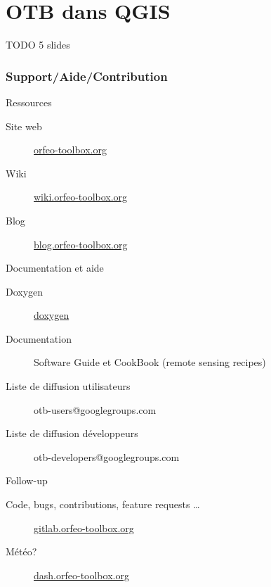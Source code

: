 \documentclass[8pt]{beamer}
\begin{document}
\section{OTB dans QGIS}

\begin{frame}
TODO 5 slides
\end{frame}

\begin{frame}
\frametitle{Support/Aide/Contribution}
\vspace{-0.2cm}
\begin{block}{Ressources}
\vspace{-0.2cm}
\begin{description}
\item[Site web] \href{http://www.orfeo-toolbox.org}{orfeo-toolbox.org}
\item[Wiki] \href{http://wiki.orfeo-toolbox.org}{wiki.orfeo-toolbox.org}
\item[Blog] \href{http://blog.orfeo-toolbox.org}{blog.orfeo-toolbox.org}
\end{description}
\end{block}
\vspace{-0.2cm}
\begin{block}{Documentation et aide}
\vspace{-0.2cm}
\begin{description}
\item[Doxygen] \href{http://www.orfeo-toolbox.org/doxygen/}{doxygen}
\item[Documentation] Software Guide et CookBook (remote sensing recipes)
\item[Liste de diffusion utilisateurs] otb-users@googlegroups.com
\item[Liste de diffusion développeurs] otb-developers@googlegroups.com
\end{description}
\end{block}
\vspace{-0.2cm}
\begin{block}{Follow-up}
\vspace{-0.2cm}
\begin{description}
\item[Code, bugs, contributions, feature requests \ldots] \href{https://gitlab.orfeo-toolbox.org/orfeotoolbox/otb}{gitlab.orfeo-toolbox.org}
\item[Météo?] \href{http://dash.orfeo-toolbox.org}{dash.orfeo-toolbox.org}
\end{description}
\end{block}
\end{frame}
\end{document}
